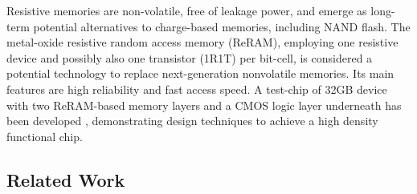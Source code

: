 \documentclass{superfri}
\begin{document}
Resistive memories are non-volatile, free of leakage power, and emerge as long-term potential alternatives to charge-based memories, including NAND flash. The metal-oxide resistive random access memory (ReRAM), employing one resistive device and possibly also one transistor (1R1T) per bit-cell, is considered a potential technology to replace next-generation nonvolatile memories. Its main features are high reliability and fast access speed. A test-chip of 32GB device with two ReRAM-based memory layers and a CMOS logic layer underneath has been developed \cite{ahn2015pim}, demonstrating design techniques to achieve a high density functional chip. 

\subsection{Related Work}
\label{sec:related_work}
\end{document}
